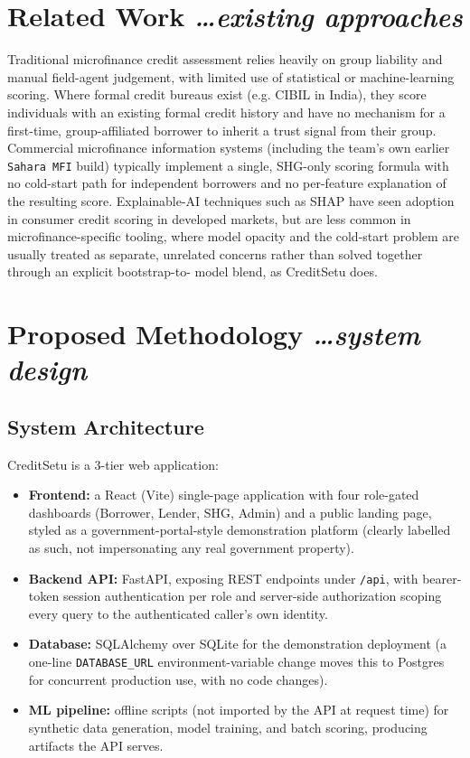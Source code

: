 \documentclass[11pt,a4paper]{article}
\newcommand{\BvrHint}[1]{%
  {\normalfont\normalsize\itshape\hfill #1}}
\begin{document}
\section{Related Work%
\BvrHint{\ldots existing approaches}}

Traditional microfinance credit assessment relies heavily on group
liability and manual field-agent judgement, with limited use of
statistical or machine-learning scoring. Where formal credit bureaus
exist (e.g. CIBIL in India), they score individuals with an existing
formal credit history and have no mechanism for a first-time,
group-affiliated borrower to inherit a trust signal from their group.
Commercial microfinance information systems (including the team's own
earlier \texttt{Sahara MFI} build) typically implement a single,
SHG-only scoring formula with no cold-start path for independent
borrowers and no per-feature explanation of the resulting score.
Explainable-AI techniques such as SHAP \cite{shap} have seen adoption
in consumer credit scoring in developed markets, but are less common
in microfinance-specific tooling, where model opacity and the
cold-start problem are usually treated as separate, unrelated
concerns rather than solved together through an explicit bootstrap-to-
model blend, as CreditSetu does.

\section{Proposed Methodology%
\BvrHint{\ldots system design}}

\subsection{System Architecture}
CreditSetu is a 3-tier web application:
\begin{itemize}[leftmargin=0.7cm]
    \item \textbf{Frontend:} a React (Vite) single-page application
    with four role-gated dashboards (Borrower, Lender, SHG, Admin) and
    a public landing page, styled as a government-portal-style
    demonstration platform (clearly labelled as such, not
    impersonating any real government property).
    \item \textbf{Backend API:} FastAPI, exposing REST endpoints under
    \texttt{/api}, with bearer-token session authentication per role
    and server-side authorization scoping every query to the
    authenticated caller's own identity.
    \item \textbf{Database:} SQLAlchemy over SQLite for the
    demonstration deployment (a one-line \texttt{DATABASE\_URL}
    environment-variable change moves this to Postgres for concurrent
    production use, with no code changes).
    \item \textbf{ML pipeline:} offline scripts (not imported by the
    API at request time) for synthetic data generation, model
    training, and batch scoring, producing artifacts the API serves.
\end{itemize}
\end{document}
